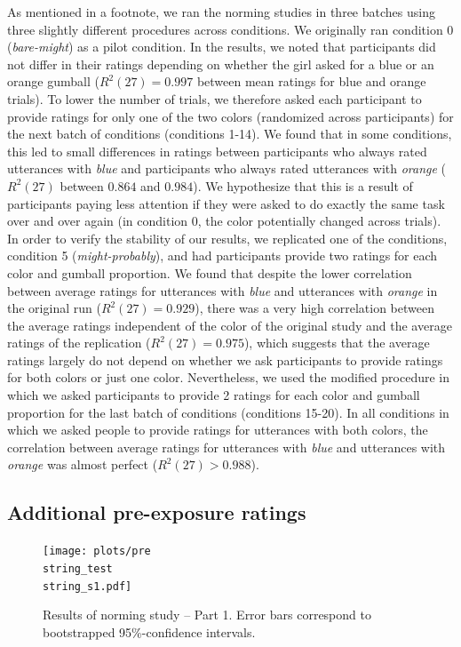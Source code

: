 \documentclass[lucida,biblatex]{sp} %
\begin{document}
As mentioned in a footnote, we ran the norming studies in three batches using three slightly different procedures across conditions. We originally ran condition 0 (\emph{bare-might}) as a pilot condition. In the results, we noted that participants did not differ in their ratings depending on whether the girl asked for a blue or an orange gumball ($R^2(27)=0.997$ between mean ratings for blue and orange trials). To lower the number of trials, we therefore asked each participant to provide ratings for only one of the two colors (randomized across participants) for the next batch of conditions (conditions 1-14). We found that in some conditions, this led to small differences in ratings between participants who always rated utterances with \emph{blue} and participants who always rated utterances with \textit{orange} ($R^2(27)$ between $0.864$ and $0.984$). We hypothesize that this is a result of participants paying less attention if they were asked to do exactly the same task over and over again (in condition 0, the color potentially changed across trials). In order to verify the stability of our results, we replicated one of the conditions, condition 5 (\emph{might-probably}), and had participants provide two ratings for each color and gumball proportion. We found that despite the lower correlation between average ratings for utterances with \emph{blue} and utterances with \emph{orange} in the original run ($R^2(27)=0.929$), there was a very high correlation between the average ratings independent of the color of the original study and the average ratings of the replication ($R^2(27)=0.975$), which suggests that the average ratings largely do not depend on whether we ask participants to provide ratings for both colors or just one color. Nevertheless, we used the modified procedure in which we asked participants to provide 2 ratings for each color and gumball proportion for the last batch of conditions (conditions 15-20). In all conditions in which we asked people to provide ratings for utterances with both colors, the correlation between average ratings for utterances with \emph{blue} and utterances with \emph{orange} was almost perfect ($R^2(27)>0.988$).

\subsection*{Additional pre-exposure ratings}

\begin{figure}
\texttt{[image: plots/pre\\string\_test\\string\_s1.pdf]}
\caption{Results of norming study -- Part 1. Error bars correspond to bootstrapped 95\%-confidence intervals. \label{fig:norming-results-1}}
\end{figure}
\end{document}

